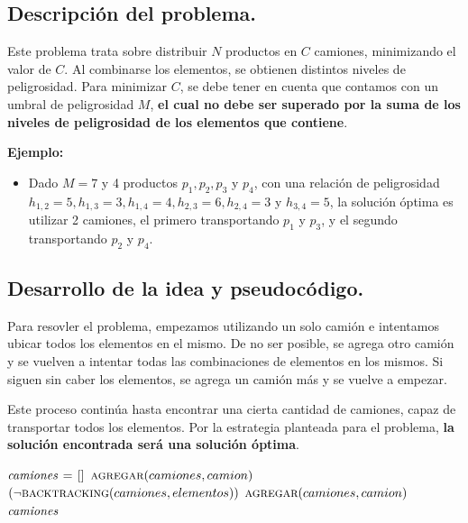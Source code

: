 \subsection{Descripción del problema.}

\vspace*{0.3cm}

Este problema trata sobre distribuir $N$ productos en $C$ camiones, minimizando
el valor de $C$. Al combinarse los elementos, se obtienen distintos niveles de peligrosidad.
Para minimizar $C$, se debe tener en cuenta que contamos con un umbral de peligrosidad
$M$, \textbf{el cual no debe ser superado por la suma de los niveles de peligrosidad de los
elementos que contiene}.

\vspace*{0.5cm}

\textbf{Ejemplo:}
\begin{itemize}
  \item Dado $M = 7$ y 4 productos $p_1, p_2, p_3$ y $p_4$, con una relación
  de peligrosidad $h_{1,2} = 5, h_{1,3} = 3, h_{1,4} = 4, h_{2,3} = 6, h_{2,4} =
  3$ y $h_{3,4} = 5$, la solución óptima es utilizar 2 camiones, el primero
  transportando $p_1$ y $p_3$, y el segundo transportando $p_2$ y $p_4$.
\end{itemize}



\subsection{Desarrollo de la idea y pseudocódigo.}

Para resovler el problema, empezamos utilizando un solo camión e intentamos ubicar
todos los elementos en el mismo. De no ser posible, se agrega otro camión y se vuelven
a intentar todas las combinaciones de elementos en los mismos. Si siguen sin caber los
elementos, se agrega un camión más y se vuelve a empezar.

Este proceso continúa hasta encontrar una cierta cantidad de camiones, capaz de
transportar todos los elementos. Por la estrategia planteada para el problema,
\textbf{la solución encontrada será una solución óptima}.

\vspace*{0.5cm}


\begin{codebox}
\li $\id{camiones} \gets []$
\li $\textnormal{\scshape agregar}(camiones, camion)$
\li \While $(\neg\textnormal{\scshape backtracking}(camiones, elementos))$
\li     \Do
            $\textnormal{\scshape agregar}(camiones, camion)$
        \End
\li \Return $\id{camiones}$
\end{codebox}


